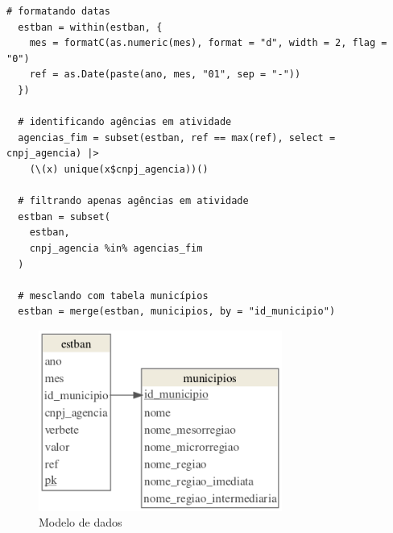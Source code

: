 \begin{anexosenv}
\begin{lstlisting}[frame=single]
  # formatando datas
  estban = within(estban, {
    mes = formatC(as.numeric(mes), format = "d", width = 2, flag = "0")
    ref = as.Date(paste(ano, mes, "01", sep = "-"))
  })
  
  # identificando agências em atividade
  agencias_fim = subset(estban, ref == max(ref), select = cnpj_agencia) |>
    (\(x) unique(x$cnpj_agencia))()
  
  # filtrando apenas agências em atividade
  estban = subset(
    estban,
    cnpj_agencia %in% agencias_fim
  )

  # mesclando com tabela municípios
  estban = merge(estban, municipios, by = "id_municipio")

\end{lstlisting}

\begin{figure}[h]
  \caption{Modelo de dados}
  \label{fig-data_model}
  \begin{center}
    \includegraphics[width=8cm]{img/data_model.png}
  \end{center}
\end{figure}

\end{anexosenv}

\printindex
